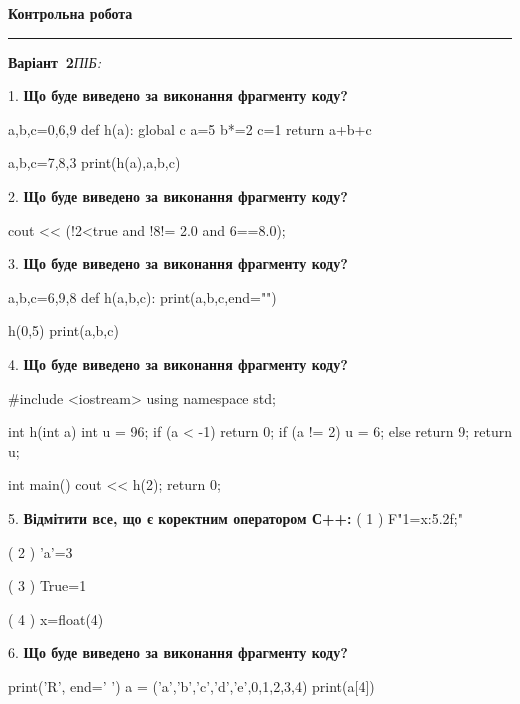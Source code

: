 \documentclass[11pt]{article}
\begin{document}
{\centering\Large\bfseries Контрольна робота\par}
\medskip
\noindent\rule{\linewidth}{0.5pt}
\smallskip
\noindent\textbf{Варіант \No\,2}\hfill \textit{ПІБ:}\,\underline{\hspace{60mm}}
\vspace{4mm}

1. \textbf{Що буде виведено за виконання фрагменту коду?}

a,b,c=0,6,9
def h(a):
global c    a=5
    b*=2
    c=1
    return a+b+c

a,b,c=7,8,3
print(h(a),a,b,c)
\vspace{5mm}

2. \textbf{Що буде виведено за виконання фрагменту коду?}

cout << (!2<true and !8!= 2.0 and 6==8.0);
\vspace{5mm}

3. \textbf{Що буде виведено за виконання фрагменту коду?}

a,b,c=6,9,8
def h(a,b,c):
    print(a,b,c,end="")

h(0,5)
print(a,b,c)

\vspace{5mm}

4. \textbf{Що буде виведено за виконання фрагменту коду?}

#include <iostream>
using namespace std;

int h(int a){
    int u = 96;
    if (a < -1) 
        return 0;
    if (a != 2)
         u = 6;
    else
         return 9;
    return u;
}

int main(){
    cout << h(2);
    return 0;
}

\vspace{5mm}

5. %
\textbf{Відмітити все, що є коректним оператором С++:}
( 1 ) F"1={x:5.2f};"

( 2 ) 'a'=3

( 3 ) True=1

( 4 ) x=float(4)
\vspace{5mm}

6. \textbf{Що буде виведено за виконання фрагменту коду?}

print('R', end=' ')
a = ('a','b','c','d','e',0,1,2,3,4)
print(a[4])

\vspace{5mm}
\end{document}
